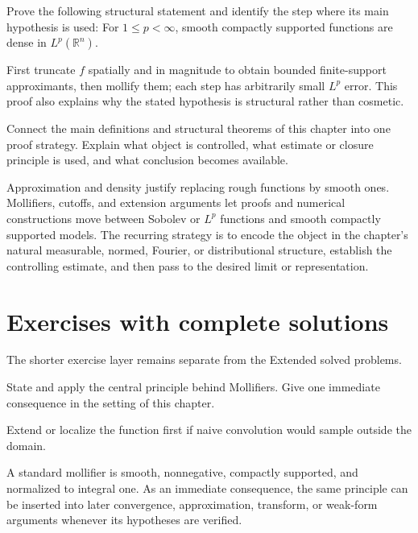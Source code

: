 \begin{problem}\label{prob:iii22-problem-11}
Prove the following structural statement and identify the step where its main hypothesis is used: For $1\le p<\infty$, smooth compactly supported functions are dense in $L^p(\mathbb R^n)$.
\end{problem}
\begin{solution}
First truncate $f$ spatially and in magnitude to obtain bounded finite-support approximants, then mollify them; each step has arbitrarily small $L^p$ error. This proof also explains why the stated hypothesis is structural rather than cosmetic.
\end{solution}

\begin{problem}\label{prob:iii22-problem-12}
Connect the main definitions and structural theorems of this chapter into one proof strategy. Explain what object is controlled, what estimate or closure principle is used, and what conclusion becomes available.
\end{problem}
\begin{solution}
Approximation and density justify replacing rough functions by smooth ones. Mollifiers, cutoffs, and extension arguments let proofs and numerical constructions move between Sobolev or $L^p$ functions and smooth compactly supported models. The recurring strategy is to encode the object in the chapter's natural measurable, normed, Fourier, or distributional structure, establish the controlling estimate, and then pass to the desired limit or representation.
\end{solution}
\section{Exercises with complete solutions}
The shorter exercise layer remains separate from the Extended solved problems.

\begin{exercise}\label{exr:iii22-01}
State and apply the central principle behind Mollifiers. Give one immediate consequence in the setting of this chapter.
\end{exercise}
\begin{hint}
Extend or localize the function first if naive convolution would sample outside the domain.
\end{hint}
\begin{solution}
A standard mollifier is smooth, nonnegative, compactly supported, and normalized to integral one. As an immediate consequence, the same principle can be inserted into later convergence, approximation, transform, or weak-form arguments whenever its hypotheses are verified.
\end{solution}

